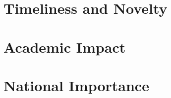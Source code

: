 \documentclass[12pt, twocolumn]{article}
\begin{document}
\section{Timeliness and Novelty}
    

\section{Academic Impact}
    

\section{National Importance}
    


{\footnotesize
}
\end{document}
